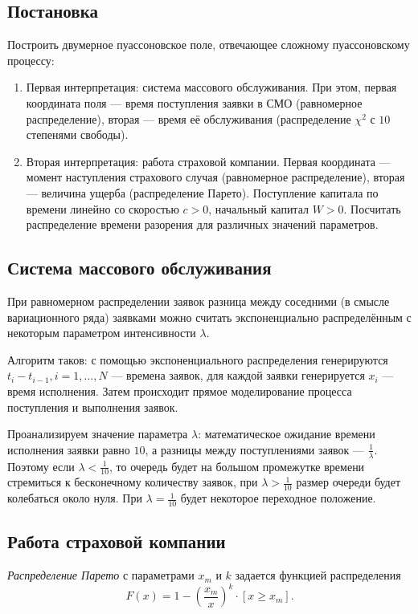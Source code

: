 \documentclass[12pt, a4paper]{article}
\begin{document}
\subsection{Постановка}
Построить двумерное пуассоновское поле, отвечающее сложному пуассоновскому процессу:
\begin{enumerate}
	\item Первая интерпретация: система массового обслуживания. При этом, первая координата поля --- время поступления заявки в СМО (равномерное распределение), вторая --- время её обслуживания (распределение $\chi^2$ с $10$ степенями свободы).
	\item Вторая интерпретация: работа страховой компании. Первая координата --- момент наступления страхового случая (равномерное распределение), вторая --- величина ущерба (распределение Парето). Поступление капитала по времени линейно со скоростью $c>0$, начальный капитал $W>0$. Посчитать распределение времени разорения для различных значений параметров.
\end{enumerate}

\subsection{Система массового обслуживания}
При равномерном распределении заявок разница между соседними (в смысле вариационного ряда) заявками можно считать экспоненциально распределённым с некоторым параметром интенсивности $\lambda$.

Алгоритм таков: с помощью экспоненциального распределения генерируются $t_i-t_{i-1}, i=1,\dots,N$ --- времена заявок, для каждой заявки генерируется $x_i$ --- время исполнения.
Затем происходит прямое моделирование процесса поступления и выполнения заявок.

Проанализируем значение параметра $\lambda$: математическое ожидание времени исполнения заявки равно $10$, а разницы между поступлениями заявок --- $\frac 1\lambda$. Поэтому если $\lambda<\frac 1{10}$, то очередь будет на большом промежутке времени стремиться к бесконечному количеству заявок, при $\lambda > \frac 1{10}$ размер очереди будет колебаться около нуля. При $\lambda = \frac 1 {10}$ будет некоторое переходное положение.

\subsection{Работа страховой компании}
\begin{df}
	\textit{Распределение Парето} с параметрами $x_m$ и $k$ задается функцией распределения 
	\[F(x)=1-\left(\frac{x_m}{x} \right)^k\cdot[x\geqslant x_m].\]
\end{df}
\end{document}
